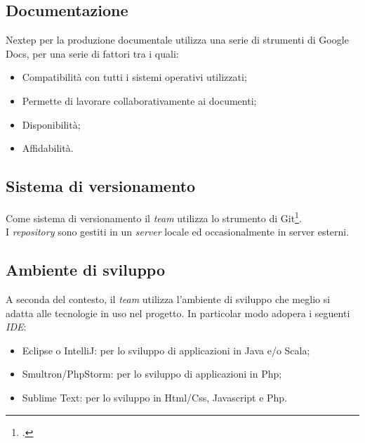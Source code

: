 \subsection{Documentazione}
Nextep per la produzione documentale utilizza una serie di strumenti di Google Docs, per una serie di fattori tra i quali:
\begin{itemize}
\item Compatibilità con tutti i sistemi operativi utilizzati;
\item Permette di lavorare collaborativamente ai documenti;
\item Disponibilità;
\item Affidabilità.
\end{itemize}
\subsection{Sistema di versionamento}
Come sistema di versionamento il \emph{team} utilizza lo strumento di Git\footcite{https://git-scm.com/}.\\I \emph{repository} sono gestiti in un \emph{server} locale ed occasionalmente in server esterni.
\subsection{Ambiente di sviluppo}
A seconda del contesto, il \emph{team} utilizza l'ambiente di sviluppo che meglio si adatta alle tecnologie in uso nel progetto. In particolar modo adopera i seguenti \emph{IDE}:
\begin{itemize}
\item Eclipse o IntelliJ: per lo sviluppo di applicazioni in Java e/o Scala;
\item Smultron/PhpStorm: per lo sviluppo di applicazioni in Php;
\item Sublime Text: per lo sviluppo in Html/Css, Javascript e Php.
\end{itemize}
\newpage
